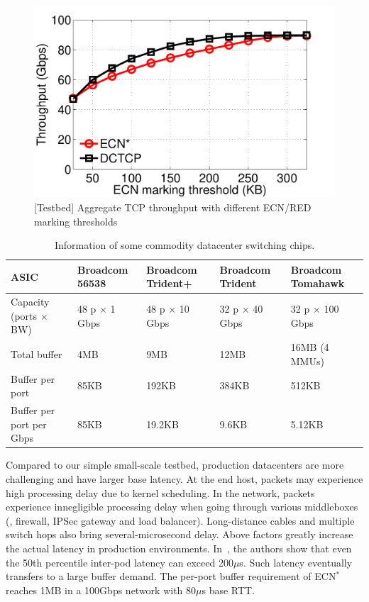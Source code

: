 \begin{figure}[t]
\centering
  \includegraphics[width=0.75\linewidth]{figs/throughput_ecn_threshold.pdf}
      \vspace{-1.5mm}
  \caption{[Testbed] Aggregate TCP throughput with different ECN/RED marking thresholds}\label{fig:throughput_ecn_thresh}
    \vspace{-6mm}
\end{figure}
\begin{table}[t]
\small
\centering
\begin{tabular}{|l|l|l|l|l|}
\hline
ASIC & Broadcom 56538 & Broadcom Trident+ & Broadcom Trident \uppercase\expandafter{\romannumeral2} & Broadcom Tomahawk \\\hline
Capacity (ports $\times$ BW) & 48 p $\times$ 1 Gbps & 48 p $\times$ 10 Gbps & 32 p $\times$ 40 Gbps & 32 p $\times$ 100 Gbps \\\hline
Total buffer             & 4MB   & 9MB  & 12MB & 16MB (4 MMUs) \\\hline
Buffer per port          & 85KB  & 192KB  & 384KB & 512KB \\\hline
Buffer per port per Gbps & 85KB  & 19.2KB & 9.6KB & 5.12KB \\\hline
\end{tabular}
\vspace{+1mm}
\caption{Information of some commodity datacenter switching chips.}
\label{tab:chip_buffer}
\vspace{-6mm}
\end{table}

Compared to our simple small-scale testbed, production datacenters are more challenging and have larger base latency. At the end host, packets may experience high processing delay due to kernel scheduling. In the network, packets experience innegligible processing delay when going through various middleboxes (\eg, firewall, IPSec gateway and load balancer). Long-distance cables and multiple switch hops also bring several-microsecond delay. Above factors greatly increase the actual latency in production environments. In~\cite{pingmesh}, the authors show that even the 50th percentile inter-pod latency can exceed 200$\mu$s. Such latency eventually transfers to a large buffer demand. The per-port buffer requirement of ECN$^{*}$ reaches 1MB in a 100Gbps network with 80$\mu$s base RTT.


